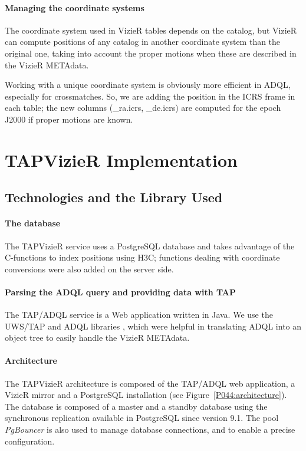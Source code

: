 \paragraph{Managing the coordinate systems}

The coordinate system used in VizieR tables depends on the catalog, but VizieR can compute positions of any catalog in another coordinate system than the original one, taking into account the proper motions when these are described in the VizieR METAdata.

Working with a unique coordinate system is obviously more efficient in ADQL, especially for crossmatches. So, we are adding the position in the ICRS frame in each table; the new columns (\_ra.icrs, \_de.icrs) are computed for the epoch J2000 if proper motions are known.


\section{TAPVizieR Implementation}

\subsection{Technologies and the Library Used}
\paragraph{The database}


The TAPVizieR service uses a PostgreSQL database and takes advantage of the C-functions to index positions using H3C;  functions dealing with coordinate conversions were also added on the server side.

\paragraph{Parsing the ADQL query and providing data with TAP}

The TAP/ADQL service is a Web application written in Java. We use the UWS/TAP and ADQL libraries \citep{simbad_tap_2011}, which were helpful in translating ADQL into an object tree to easily handle the VizieR METAdata. 

\paragraph{Architecture}
The TAPVizieR architecture is composed of the TAP/ADQL web application, a VizieR mirror and a PostgreSQL installation (see Figure~\ref{P044:architecture}). The database is composed of a master and a standby database using the synchronous replication available in PostgreSQL since version 9.1. The pool {\em PgBouncer} is also used to manage database connections, and to enable a precise configuration. 

